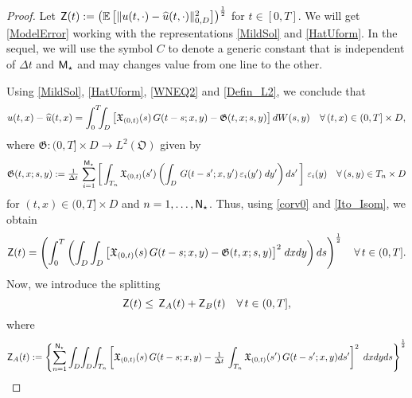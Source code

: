 \documentclass[10pt]{amsart}
\numberwithin{equation}{section}
\begin{document}
\begin{proof}
Let ${\sf Z}(t):=\left({\mathbb E}\left[\|u(t,\cdot)-{\widehat u}(t,\cdot)\|_{{\scriptscriptstyle} 0,D}^2
\right]\right)^{\frac{1}{2}}$ for $t\in[0,T]$. We will get \eqref{ModelError} working with the 
representations \eqref{MildSol} and \eqref{HatUform}. In the sequel,  we will use the symbol
$C$ to denote a generic constant that is independent of $\Delta{t}$ and ${\sf M}_{\star}$
and may changes value from one line to the other.
\par
Using \eqref{MildSol}, \eqref{HatUform}, \eqref{WNEQ2}
and \eqref{Defin_L2}, we conclude that
\begin{equation}\label{corv0}
u(t,x)-{\widehat u}(t,x)=\int_0^{{\scriptscriptstyle} T}\!\!\!\int_{{\scriptscriptstyle} D} \big[{\mathfrak
X}_{(0,t)}(s)\,G(t-s;x,y) -{\mathfrak G}(t,x;s,y)\big]\,dW(s,y)
\quad\forall\,(t,x)\in(0,T]\times D,
\end{equation}
where ${\mathfrak G}:(0,T]\times D\rightarrow L^2({\mathfrak O})$
given by
\begin{equation}\label{frak_G}
{\mathfrak G}(t,x;s,y)
:=\tfrac{1}{\Delta{t}}\,\sum_{i=1}^{{\scriptscriptstyle} {\sf M}_{\star}}
\left[\,\int_{{\scriptscriptstyle} T_n}{\mathfrak X}_{(0,t)}(s')\left(\int_{{\scriptscriptstyle} D}
\,G(t-s';x,y')\,\varepsilon_i(y')\;dy'\right)ds'\,\right]
\,\varepsilon_i(y)\quad\forall\,(s,y)\in T_n\times D
\end{equation}
for $(t,x)\in(0,T]\times D$ and $n=1,\dots,{\sf N}_{\star}$.
Thus, using \eqref{corv0} and \eqref{Ito_Isom}, we obtain
\begin{equation*}
{\sf Z}(t)=\left(\int_0^{{\scriptscriptstyle} T}\left(\int_{{\scriptscriptstyle} D}\int_{{\scriptscriptstyle} D}
 \big[{\mathfrak
X}_{(0,t)}(s)\,G(t-s;x,y) -{\mathfrak G}(t,x;s,y)\big]^2\;dxdy\right)ds\right)^{\frac{1}{2}}
\quad\forall\,t\in(0,T].
\end{equation*}
Now, we introduce the splitting
\begin{equation}\label{corv1}
{\sf Z}(t)\leq\,{\sf Z}_{{\scriptscriptstyle} A}(t)
+{\sf Z}_{{\scriptscriptstyle} B}(t)\quad\forall\,t\in(0,T],
\end{equation}
where
\begin{equation}\label{ZaZa}
{\sf Z}_{{\scriptscriptstyle} A}(t):=\left\{
\sum_{n=1}^{{\sf N}_{\star}}\int_{{\scriptscriptstyle} D}\!\int_{{\scriptscriptstyle} D}\!\int_{{\scriptscriptstyle} T_n}
\left[{\mathfrak X}_{(0,t)}(s)\,G(t-s;x,y)-\tfrac{1}{\Delta{t}}\,\int_{{\scriptscriptstyle} T_n}
{\mathfrak X}_{(0,t)}(s')\,G(t-s';x,y)ds'\right]^2\;dxdyds\right\}^{\frac{1}{2}}

\end{equation}
\end{proof}
\end{document}
